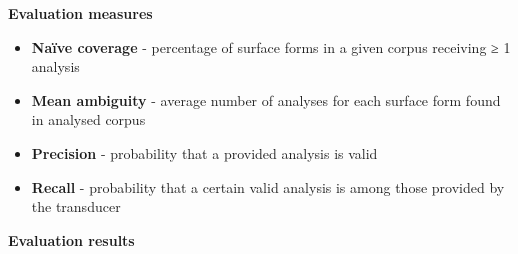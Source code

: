 \documentclass[fontscale=0.3,landscape,paperwidth=72in,paperheight=36in]{baposter}  %
\newcommand{\htwo}[1]{{\htwofont \textbf{\dotfill{}#1\dotfill{}}}}
\begin{document}
\begin{poster}
{%
			\htwo{Evaluation measures}
			\begin{itemize}
				\item \textbf{Naïve coverage} - percentage of surface forms in a given corpus receiving ≥ 1 analysis%
				\item \textbf{Mean ambiguity} - average number of analyses for each surface form found in analysed corpus
				\item \textbf{Precision} - probability that a provided analysis is valid
				\item \textbf{Recall} - probability that a certain valid analysis is among those provided by the transducer
			\end{itemize}
			\htwo{Evaluation results}
			\vspace{-0.5em}
\begin{center}
\end{center}}
\end{poster}
\end{document}
